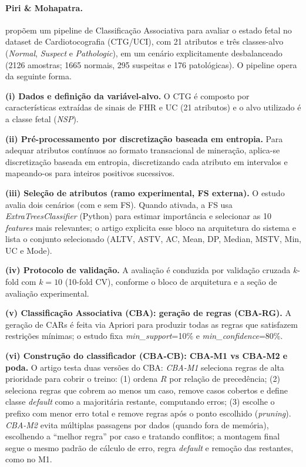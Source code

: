 \paragraph*{Piri \& Mohapatra.}

 propõem um pipeline de Classificação Associativa para avaliar o estado fetal no dataset de Cardiotocografia (CTG/UCI), com 21 atributos e três classes-alvo (\textit{Normal}, \textit{Suspect} e \textit{Pathologic}), em um cenário explicitamente desbalanceado (2126 amostras; 1665 normais, 295 suspeitas e 176 patológicas). O pipeline opera da seguinte forma.

\textbf{(i) Dados e definição da variável-alvo.}
O CTG é composto por características extraídas de sinais de FHR e UC (21 atributos) e o alvo utilizado é a classe fetal (\textit{NSP}). 

\textbf{(ii) Pré-processamento por discretização baseada em entropia.}
Para adequar atributos contínuos ao formato transacional de mineração, aplica-se discretização baseada em entropia, discretizando cada atributo em intervalos e mapeando-os para inteiros positivos sucessivos. 

\textbf{(iii) Seleção de atributos (ramo experimental, FS externa).}
O estudo avalia dois cenários (com e sem FS). Quando ativada, a FS usa \textit{ExtraTreesClassifier} (Python) para estimar importância e selecionar as 10 \textit{features} mais relevantes; o artigo explicita esse bloco na arquitetura do sistema e lista o conjunto selecionado (ALTV, ASTV, AC, Mean, DP, Median, MSTV, Min, UC e Mode). 

\textbf{(iv) Protocolo de validação.}
A avaliação é conduzida por validação cruzada $k$-fold com $k=10$ (10-fold CV), conforme o bloco de arquitetura e a seção de avaliação experimental. 

\textbf{(v) Classificação Associativa (CBA): geração de regras (CBA-RG).}
A geração de CARs é feita via Apriori para produzir todas as regras que satisfazem restrições mínimas; o estudo fixa \textit{min\_support}=10\% e \textit{min\_confidence}=80\%. 

\textbf{(vi) Construção do classificador (CBA-CB): CBA-M1 vs CBA-M2 e poda.}
O artigo testa duas versões do CBA:
\textit{CBA-M1} seleciona regras de alta prioridade para cobrir o treino: (1) ordena $R$ por relação de precedência; (2) seleciona regras que cobrem ao menos um caso, remove casos cobertos e define classe \textit{default} como a majoritária restante, computando erros; (3) escolhe o prefixo com menor erro total e remove regras após o ponto escolhido (\textit{pruning}). 
\textit{CBA-M2} evita múltiplas passagens por dados (quando fora de memória), escolhendo a “melhor regra” por caso e tratando conflitos; a montagem final segue o mesmo padrão de cálculo de erro, regra \textit{default} e remoção das restantes, como no M1.

